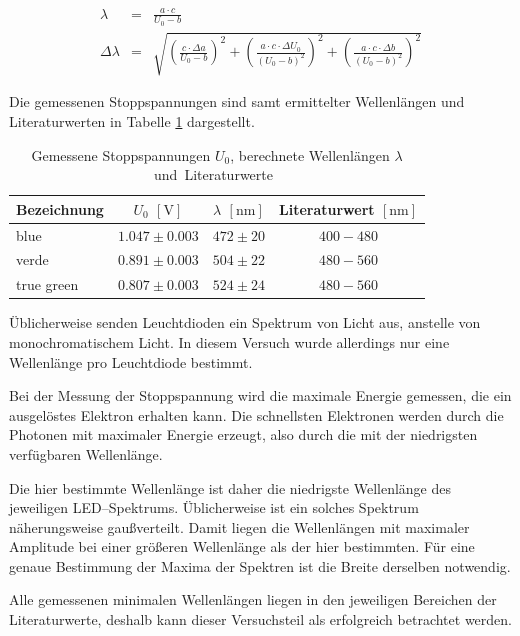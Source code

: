 \documentclass[12pt,a4paper]{scrartcl}
\numberwithin{equation}{section} %
\begin{document}
\begin{eqnarray}
	\lambda &=& \frac{a \cdot c}{U_0 - b} \\
	\Delta \lambda &=&
		\sqrt{
				\left(
					\frac{c \cdot \Delta a}{U_0 - b}
				\right)^2
				+ \left(
					\frac{a \cdot c \cdot \Delta U_0}{(U_0 - b)^2}
				\right)^2
				+ \left(
					\frac{a \cdot c \cdot \Delta b}{(U_0 - b)^2}
				\right)^2
		}
\end{eqnarray}

\noindent
Die gemessenen Stoppspannungen sind samt ermittelter Wellenlängen und Literaturwerten in Tabelle \ref{table:leds} dargestellt.

\begin{table}[h!]
	\centering
	\begin{tabular}{l|c|c|c}
		Bezeichnung & $U_0$ $[\mathrm{V}]$ & $\lambda$ $[\mathrm{nm}]$ & Literaturwert $[\mathrm{nm}]$ \\
		\hline
		blue & $1.047 \pm 0.003$ & $472 \pm 20$ & $400 - 480$ \\
		verde & $0.891 \pm 0.003$ & $504 \pm 22$ & $480 - 560$ \\
		true green & $0.807 \pm 0.003$ & $524 \pm 24$ & $480 - 560$
	\end{tabular}
	\caption{Gemessene Stoppspannungen $U_0$, berechnete Wellenlängen $\lambda$ und~Literaturwerte~\cite{Gerthsen}}
	\label{table:leds}
\end{table}

Üblicherweise senden Leuchtdioden ein Spektrum von Licht aus, anstelle von monochromatischem Licht. In diesem Versuch wurde allerdings nur eine Wellenlänge pro Leuchtdiode bestimmt.

Bei der Messung der Stoppspannung wird die maximale Energie gemessen, die ein ausgelöstes Elektron erhalten kann. Die schnellsten Elektronen werden durch die Photonen mit maximaler Energie erzeugt, also durch die mit der niedrigsten verfügbaren Wellenlänge.

Die hier bestimmte Wellenlänge ist daher die niedrigste Wellenlänge des jeweiligen LED--Spektrums. Üblicherweise ist ein solches Spektrum näherungsweise gaußverteilt. Damit liegen die Wellenlängen mit maximaler Amplitude bei einer größeren Wellenlänge als der hier bestimmten. Für eine genaue Bestimmung der Maxima der Spektren ist die Breite derselben notwendig.

Alle gemessenen minimalen Wellenlängen liegen in den jeweiligen Bereichen der Literaturwerte, deshalb kann dieser Versuchsteil als erfolgreich betrachtet werden.
\end{document}
